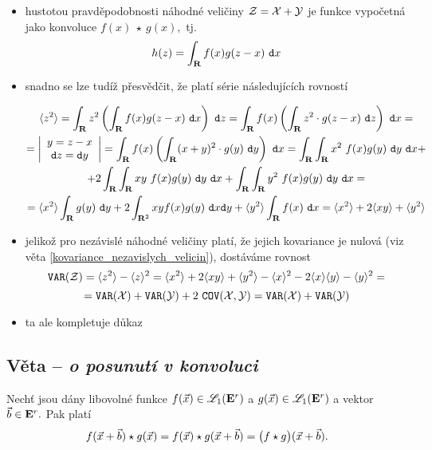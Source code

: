 \Proof

\begin{itemize}

\item hustotou pravd\v epodobnosti n\'ahodn\'e veli\v ciny ${\mathcal{Z}}={\mathcal X}+{\mathcal Y}$ je funkce vypo\v cetn\'a jako konvoluce $f(x)~\star~g(x),$  tj. $$h(z)= \int_{{\mathbf R}}f(x)g(z-x)~\mathtt{d}x$$

\item snadno se lze tud\'i\v z p\v resv\v ed\v cit, \v ze plat\'i s\'erie n\'asleduj\'ic\'ich rovnost\'i

\begin{multline*}
\la z^2 \ra=\int_{\R}z^2\left(\int_{\R}f(x)g(z-x)~\dx\right)~\dz=\int_\R
f(x)\left(\int_\R z^2\cdot g(z-x)~\dz\right)~\dx{}=\\
%
=\left|\begin{array}{c} y=z-x\\ \dz=\dy \end{array}\right|= \int_\R
f(x)\left(\int_\R (x+y)^2\cdot g(y)~\dy\right)~\dx=\int_\R\int_\R
x^2~f(x)g(y)~\dy~\dx{}+\\
%
+2\int_\R\int_\R
xy~f(x)g(y)~\dy~\dx+\int_\R\int_\R
y^2~f(x)g(y)~\dy~\dx{}=\\
%
=\la x^2\ra\int_{\R} g(y)~\dy+2\int_{\R^2} xyf(x)g(y)~\dx\dy + \la y^2 \ra\int_{\R}
f(x)~\dx=\la x^2 \ra+2 \la xy \ra+ \la y^2 \ra
\end{multline*}


\item jeliko\v z pro nez\'avisl\'e náhodné veli\v ciny plat\'i, \v ze jejich kovariance je nulov\'a (viz v\v eta \ref{kovariance_nezavislych_velicin}), dost\'av\'ame rovnost $$\mathtt{VAR}({\mathcal{Z}})=\langle z^2 \rangle - \langle z \rangle^2 = \langle x^2 \rangle+2 \langle xy \rangle+ \langle y^2 \rangle - \langle x \rangle^2 - 2 \langle x \rangle\langle y \rangle -  \langle y\rangle^2 =$$ $$=\mathtt{VAR}({\mathcal X}) + \mathtt{VAR}({\mathcal Y}) + 2~\mathtt{COV}({\mathcal X},{\mathcal Y})=\mathtt{VAR}({\mathcal X}) + \mathtt{VAR}({\mathcal Y}) $$

\item ta ale kompletuje d\r ukaz

\end{itemize}

\subsection{Věta -- \emph{o posunutí v konvoluci}}

Nech\v t jsou d\'any libovoln\'e funkce $f({\vec{x}})\in{\mathscr L}_1({{\mathbf E}^r})$ a $g({\vec{x}})\in{\mathscr L}_1({{\mathbf E}^r})$ a vektor ${\vec{b}}\in{{\mathbf E}^r}.$ Pak plat\'i
%
$$ f({\vec{x}}+{\vec{b}}) \star g({\vec{x}}) = f({\vec{x}}) \star g({\vec{x}}+{\vec{b}}) = \bigl(f \star g\bigr) ({\vec{x}}+{\vec{b}}).$$

